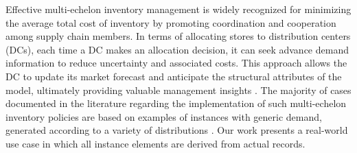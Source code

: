 \documentclass[ijoc,sglanonrev]{informs4}
\begin{document}


Effective multi-echelon inventory management is widely recognized for minimizing the average total cost of inventory by promoting coordination and cooperation among supply chain members. 
In terms of allocating stores to distribution centers (DCs), each time a DC makes an allocation decision, it can seek advance demand information to reduce uncertainty and associated costs. This approach allows the DC to update its market forecast and anticipate the structural attributes of the model, ultimately providing valuable management insights \citep{P16}.
The majority of cases documented in the literature regarding the implementation of such multi-echelon inventory policies are based on examples of instances with generic demand, generated according to a variety of distributions \citep{Escorcia20,EG81}. Our work presents a real-world use case in which all instance elements are derived from actual records.
\end{document}
